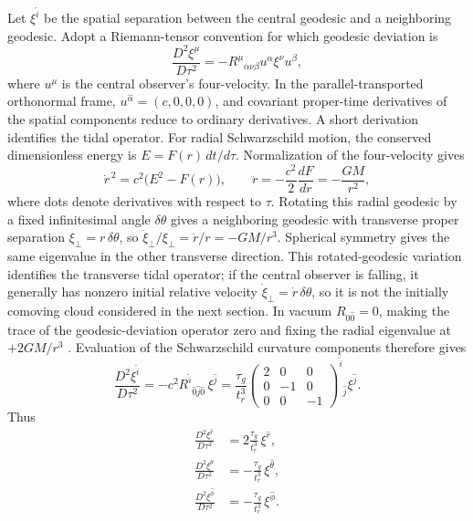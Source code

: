 \documentclass[12pt]{article}
\begin{document}
Let $\xi^{\hat i}$ be the spatial separation between the central geodesic and a neighboring geodesic. Adopt a Riemann-tensor convention for which geodesic deviation is
\begin{equation}
  \frac{D^2\xi^\mu}{D\tau^2}
  =-R^\mu{}_{\alpha\nu\beta}
      u^\alpha\xi^\nu u^\beta,
  \label{eq:geodesic-deviation}
\end{equation}
where $u^\mu$ is the central observer's four-velocity. In the parallel-transported orthonormal frame, $u^{\hat\alpha}=(c,0,0,0)$, and covariant proper-time derivatives of the spatial components reduce to ordinary derivatives. A short derivation identifies the tidal operator. For radial Schwarzschild motion, the conserved dimensionless energy is $E=F(r)\,dt/d\tau$. Normalization of the four-velocity gives
\begin{equation}
  \dot r^{\,2}=c^2\bigl(E^2-F(r)\bigr),
  \qquad
  \ddot r=-\frac{c^2}{2}\frac{dF}{dr}=-\frac{GM}{r^2},
  \label{eq:radial-geodesic}
\end{equation}
where dots denote derivatives with respect to $\tau$. Rotating this radial geodesic by a fixed infinitesimal angle $\delta\theta$ gives a neighboring geodesic with transverse proper separation $\xi_\perp=r\,\delta\theta$, so $\ddot\xi_\perp/\xi_\perp=\ddot r/r=-GM/r^3$. Spherical symmetry gives the same eigenvalue in the other transverse direction. This rotated-geodesic variation identifies the transverse tidal operator; if the central observer is falling, it generally has nonzero initial relative velocity $\dot\xi_\perp=\dot r\,\delta\theta$, so it is not the initially comoving cloud considered in the next section. In vacuum $R_{\hat 0\hat 0}=0$, making the trace of the geodesic-deviation operator zero and fixing the radial eigenvalue at $+2GM/r^3$ \cite{TongGR,OregonTides}. Evaluation of the Schwarzschild curvature components therefore gives
\begin{equation}
  \frac{D^2\xi^{\hat i}}{D\tau^2}
  =-c^2R^{\hat i}{}_{\hat 0\hat j\hat 0}\,\xi^{\hat j}
  =\frac{\tau_g}{t_r^3}
    \begin{pmatrix}
      2&0&0\\
      0&-1&0\\
      0&0&-1
    \end{pmatrix}^{\hat i}{}_{\hat j}
    \xi^{\hat j}.
  \label{eq:tidal-matrix}
\end{equation}
Thus
\begin{align}
  \frac{D^2\xi^{\hat r}}{D\tau^2}
    &=2\frac{\tau_g}{t_r^3}\,\xi^{\hat r},\\
  \frac{D^2\xi^{\hat\theta}}{D\tau^2}
    &=-\frac{\tau_g}{t_r^3}\,\xi^{\hat\theta},\\
  \frac{D^2\xi^{\hat\phi}}{D\tau^2}
    &=-\frac{\tau_g}{t_r^3}\,\xi^{\hat\phi}.
  \label{eq:tidal-components}
\end{align}
\end{document}
